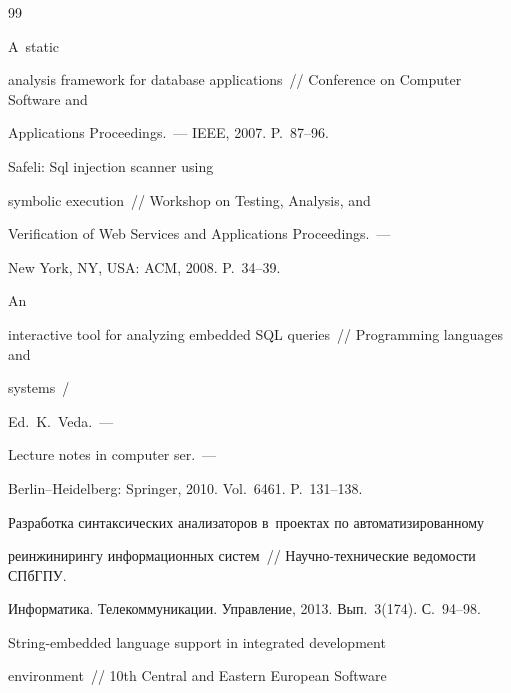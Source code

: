 {{\begin{thebibliography}{99}


 A~static 


analysis framework for database applications~/\!\!/ Conference on Computer Software and 


Applications Proceedings.~--- IEEE, 2007. P.~87--96.







 Safeli: Sql injection scanner using 


symbolic execution~/\!\!/ Workshop on Testing, Analysis, and 


Verification of Web Services and Applications Proceedings.~--- 


New York, NY, USA: ACM, 2008.  P.~34--39.







 An 


interactive tool for analyzing embedded SQL queries~/\!\!/ Programming languages and 


systems~/


Ed.\ K.~Veda.~--- 


Lecture notes in computer ser.~---


Berlin--Heidelberg: Springer, 2010. Vol.~6461. P.~131--138.









Разработка синтаксических анализаторов в~проектах по автоматизированному 


реинжинирингу информационных систем~/\!\!/ Научно-технические ведомости СПбГПУ. 


Информатика. Телекоммуникации. Управление, 2013. Вып.~3(174). С.~94--98.







 String-embedded language support in integrated development 


environment~/\!\!/ 10th Central and Eastern European Software 



\end{thebibliography}}}
